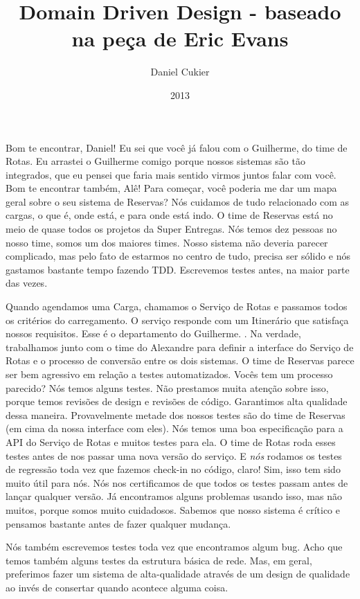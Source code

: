 \documentclass[12pt,play]{article}
\title{Domain Driven Design - baseado na peça de Eric Evans}
\author{Daniel Cukier}
\date{2013}
\begin{document}
\playstart


\act
\scene
{}
\alex Bom te encontrar, Daniel! Eu sei que você já falou com o Guilherme, do time de Rotas. Eu arrastei o Guilherme comigo porque nossos sistemas são tão integrados, que eu pensei que faria mais sentido virmos juntos falar com você.
\dani Bom te encontrar também, Alê! Para começar, você poderia me dar um mapa geral sobre o seu sistema de Reservas?
\alex Nós cuidamos de tudo relacionado com as cargas, o que é, onde está, e para onde está indo. O time de Reservas está no meio de quase todos os projetos da Super Entregas. Nós temos dez pessoas no nosso time, somos um dos maiores times. Nosso sistema não deveria parecer complicado, mas pelo fato de estarmos no centro de tudo, precisa ser sólido e nós gastamos bastante tempo fazendo TDD. Escrevemos testes antes, na maior parte das vezes.

Quando agendamos uma Carga, chamamos o Serviço de Rotas e passamos todos os critérios do carregamento. O serviço responde com um Itinerário que satisfaça nossos requisitos. Esse é o departamento do Guilherme. .
\gui Na verdade, trabalhamos junto com o time do Alexandre para definir a interface do Serviço de Rotas e o processo de conversão entre os dois sistemas.
\dani O time de Reservas parece ser bem agressivo em relação a testes automatizados. Vocês tem um processo parecido?
\gui Nós temos alguns testes.  Não prestamos muita atenção sobre isso, porque temos revisões de design e revisões de código. Garantimos alta qualidade dessa maneira. Provavelmente metade dos nossos testes são do time de Reservas (em cima da nossa interface com eles).
\alex Nós temos uma boa especificação para a API do Serviço de Rotas e muitos testes para ela. O time de Rotas roda esses testes antes de nos passar uma nova versão do serviço. E \emph{nós} rodamos os testes de regressão toda vez que fazemos check-in no código, claro!
\gui Sim, isso tem sido muito útil para nós. Nós nos certificamos de que todos os testes passam antes de lançar qualquer versão. Já encontramos alguns problemas usando isso, mas não muitos, porque somos muito cuidadosos. Sabemos que nosso sistema é crítico e pensamos bastante antes de fazer qualquer mudança.

Nós também escrevemos testes toda vez que encontramos algum bug. Acho que temos também alguns testes da estrutura básica de rede. Mas, em geral, preferimos fazer um sistema de alta-qualidade através de um design de qualidade ao invés de consertar quando acontece alguma coisa.
\end{document}
